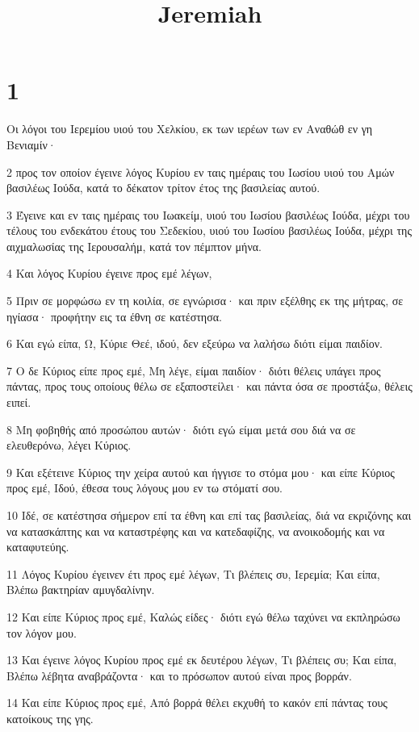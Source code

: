 

\title{Jeremiah}


\chapter{1}

\par Οι λόγοι του Ιερεμίου υιού του Χελκίου, εκ των ιερέων των εν Αναθώθ εν γη Βενιαμίν·
\par 2 προς τον οποίον έγεινε λόγος Κυρίου εν ταις ημέραις του Ιωσίου υιού του Αμών βασιλέως Ιούδα, κατά το δέκατον τρίτον έτος της βασιλείας αυτού.
\par 3 Έγεινε και εν ταις ημέραις του Ιωακείμ, υιού του Ιωσίου βασιλέως Ιούδα, μέχρι του τέλους του ενδεκάτου έτους του Σεδεκίου, υιού του Ιωσίου βασιλέως Ιούδα, μέχρι της αιχμαλωσίας της Ιερουσαλήμ, κατά τον πέμπτον μήνα.
\par 4 Και λόγος Κυρίου έγεινε προς εμέ λέγων,
\par 5 Πριν σε μορφώσω εν τη κοιλία, σε εγνώρισα· και πριν εξέλθης εκ της μήτρας, σε ηγίασα· προφήτην εις τα έθνη σε κατέστησα.
\par 6 Και εγώ είπα, Ω, Κύριε Θεέ, ιδού, δεν εξεύρω να λαλήσω διότι είμαι παιδίον.
\par 7 Ο δε Κύριος είπε προς εμέ, Μη λέγε, είμαι παιδίον· διότι θέλεις υπάγει προς πάντας, προς τους οποίους θέλω σε εξαποστείλει· και πάντα όσα σε προστάξω, θέλεις ειπεί.
\par 8 Μη φοβηθής από προσώπου αυτών· διότι εγώ είμαι μετά σου διά να σε ελευθερόνω, λέγει Κύριος.
\par 9 Και εξέτεινε Κύριος την χείρα αυτού και ήγγισε το στόμα μου· και είπε Κύριος προς εμέ, Ιδού, έθεσα τους λόγους μου εν τω στόματί σου.
\par 10 Ιδέ, σε κατέστησα σήμερον επί τα έθνη και επί τας βασιλείας, διά να εκριζόνης και να κατασκάπτης και να καταστρέφης και να κατεδαφίζης, να ανοικοδομής και να καταφυτεύης.
\par 11 Λόγος Κυρίου έγεινεν έτι προς εμέ λέγων, Τι βλέπεις συ, Ιερεμία; Και είπα, Βλέπω βακτηρίαν αμυγδαλίνην.
\par 12 Και είπε Κύριος προς εμέ, Καλώς είδες· διότι εγώ θέλω ταχύνει να εκπληρώσω τον λόγον μου.
\par 13 Και έγεινε λόγος Κυρίου προς εμέ εκ δευτέρου λέγων, Τι βλέπεις συ; Και είπα, Βλέπω λέβητα αναβράζοντα· και το πρόσωπον αυτού είναι προς βορράν.
\par 14 Και είπε Κύριος προς εμέ, Από βορρά θέλει εκχυθή το κακόν επί πάντας τους κατοίκους της γης.
